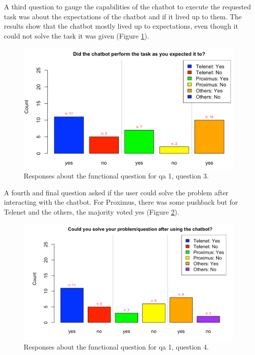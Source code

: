\break
A third question to gauge the capabilities of the chatbot to execute the requested task was about the expectations of the chatbot and if it lived up to them. The results show that the chatbot mostly lived up to expectations, even though it could not solve the task it was given (Figure \ref{fig:Q1c}).\\
\begin{figure}[!htb]
	\centering
	\includegraphics[width=375pt]{../LaTeX/Figures/Comparative/Q1c.png}
	\caption{Responses about the functional question for \acrshort{qa} 1, question 3.}\label{fig:Q1c}
\end{figure}
\break
A fourth and final question asked if the user could solve the problem after interacting with the chatbot. For Proximus, there was some pushback but for Telenet and the others, the majority voted yes (Figure \ref{fig:DQ1c}).\\
\begin{figure}[!htb]
	\centering
	\includegraphics[width=375pt]{../LaTeX/Figures/Comparative/DQ1c.png}
	\caption{Responses about the functional question for \acrshort{qa} 1, question 4.}\label{fig:DQ1c}
\end{figure}
